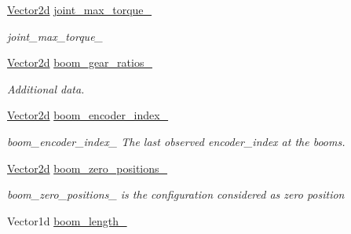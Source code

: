\begin{DoxyCompactItemize}
\mbox{\label{classblmc__robots_1_1Stuggihop_acd8110dd472072fb138d95964fefaa36}} 
\hyperlink{common__header_8hpp_acb6916bc8c9fe9d98c484fd4cc201447}{Vector2d} \hyperlink{classblmc__robots_1_1Stuggihop_acd8110dd472072fb138d95964fefaa36}{joint\+\_\+max\+\_\+torque\+\_\+}
\begin{DoxyCompactList}\small\item\em joint\+\_\+max\+\_\+torque\+\_\+ \end{DoxyCompactList}\item 
\hyperlink{common__header_8hpp_acb6916bc8c9fe9d98c484fd4cc201447}{Vector2d} \hyperlink{classblmc__robots_1_1Stuggihop_a84f6ffe6ea3058bb908a4915e040e936}{boom\+\_\+gear\+\_\+ratios\+\_\+}
\begin{DoxyCompactList}\small\item\em Additional data. \end{DoxyCompactList}\item 
\mbox{\label{classblmc__robots_1_1Stuggihop_aacd3bb51e67331ec1e723a6f9a19a7b1}} 
\hyperlink{common__header_8hpp_acb6916bc8c9fe9d98c484fd4cc201447}{Vector2d} \hyperlink{classblmc__robots_1_1Stuggihop_aacd3bb51e67331ec1e723a6f9a19a7b1}{boom\+\_\+encoder\+\_\+index\+\_\+}
\begin{DoxyCompactList}\small\item\em boom\+\_\+encoder\+\_\+index\+\_\+ The last observed encoder\+\_\+index at the booms. \end{DoxyCompactList}\item 
\mbox{\label{classblmc__robots_1_1Stuggihop_ac07e867e6e76dde5980e18cff7f69d04}} 
\hyperlink{common__header_8hpp_acb6916bc8c9fe9d98c484fd4cc201447}{Vector2d} \hyperlink{classblmc__robots_1_1Stuggihop_ac07e867e6e76dde5980e18cff7f69d04}{boom\+\_\+zero\+\_\+positions\+\_\+}
\begin{DoxyCompactList}\small\item\em boom\+\_\+zero\+\_\+positions\+\_\+ is the configuration considered as zero position \end{DoxyCompactList}\item 
\mbox{\label{classblmc__robots_1_1Stuggihop_a65986a607e6ab98fa497abfdfebc0f7a}} 
Vector1d \hyperlink{classblmc__robots_1_1Stuggihop_a65986a607e6ab98fa497abfdfebc0f7a}{boom\+\_\+length\+\_\+}

\end{DoxyCompactItemize}
